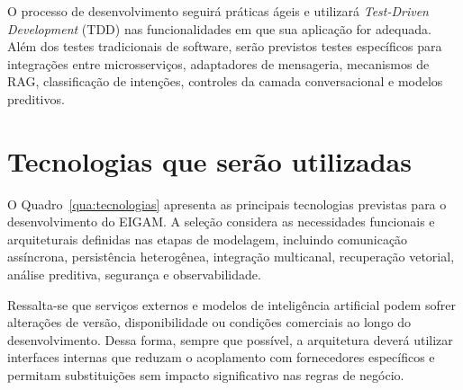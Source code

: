 O processo de desenvolvimento seguirá práticas ágeis e utilizará \textit{Test-Driven Development} (TDD) nas funcionalidades em que sua aplicação for adequada. Além dos testes tradicionais de software, serão previstos testes específicos para integrações entre microsserviços, adaptadores de mensageria, mecanismos de RAG, classificação de intenções, controles da camada conversacional e modelos preditivos.


\section{Tecnologias que serão utilizadas}

O Quadro~\ref{qua:tecnologias} apresenta as principais tecnologias previstas para o desenvolvimento do EIGAM. A seleção considera as necessidades funcionais e arquiteturais definidas nas etapas de modelagem, incluindo comunicação assíncrona, persistência heterogênea, integração multicanal, recuperação vetorial, análise preditiva, segurança e observabilidade.

Ressalta-se que serviços externos e modelos de inteligência artificial podem sofrer alterações de versão, disponibilidade ou condições comerciais ao longo do desenvolvimento. Dessa forma, sempre que possível, a arquitetura deverá utilizar interfaces internas que reduzam o acoplamento com fornecedores específicos e permitam substituições sem impacto significativo nas regras de negócio.


